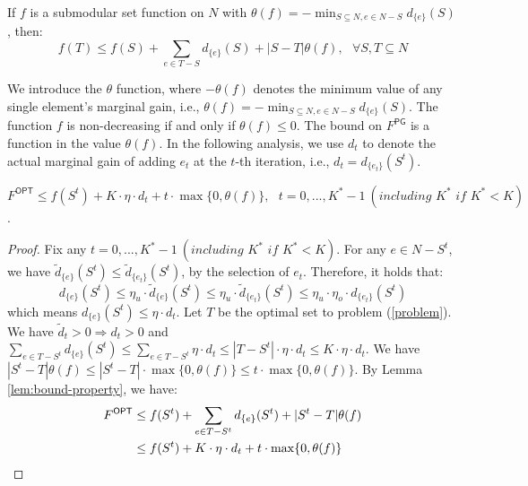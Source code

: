 \begin{lemma}  \label{lem:bound-property}
If $f$ is a submodular set function on $N$ with $\theta(f) = - \min_{S \subseteq N, e \in N - S}{d_{\{e\}}{(S)}}$, then:
\[ f(T) \leq f(S) + \sum_{e \in T - S}{d_{\{e\}}(S)} + |S-T| \theta(f), ~~~ \forall S, T \subseteq N \]
\end{lemma}

We introduce the $\theta$ function, where $-\theta(f)$ denotes the minimum value of any single element's marginal gain, i.e.,  
$\theta(f) = - \min_{S \subseteq N, e \in N - S}{d_{\{e\}}{(S)}}$.
The function $f$ is non-decreasing if and only if $\theta(f) \leq 0$. The bound on $F^{\textsf{PG}}$ is a function in the value $\theta(f)$. In the following analysis, we use $d_t$ to denote the actual marginal gain of adding $e_t$ at the $t$-th iteration, i.e., $d_t = {d}_{\{e_t\}}(S^{t})$. 


\begin{lemma} \label{lem:bounds on f(S^t)}
$F^{\textsf{OPT}} \leq f(S^t) + K \cdot \eta \cdot d_{t} + t \cdot \max \{ 0, \theta(f) \}, ~~~ t = 0, ..., K^*-1 ~(\textit{including } K^* \textit{ if } K^* < K)$.
\end{lemma}
\begin{proof}
Fix any $t = 0, ..., K^* - 1 ~(\textit{including } K^* \textit{ if } K^* < K)$. 
For any $e \in N - S^t$, we have $\tilde{d}_{\{e\}}(S^{t}) \leq \tilde{d}_{\{e_t\}}(S^{t})$, by the selection of $e_t$. Therefore, it holds that:
\[ d_{\{e\}}(S^t) \leq \eta_u \cdot \tilde{d}_{\{e\}}(S^{t}) \leq \eta_u \cdot \tilde{d}_{\{e_t\}}(S^{t}) \leq \eta_u \cdot \eta_o \cdot {d}_{\{e_t\}}(S^{t}) \]
which means $d_{\{e\}}(S^t) \leq \eta \cdot d_t$. 
Let $T$ be the optimal set to problem (\ref{problem}). We have $\tilde{d}_t > 0 \Rightarrow d_t > 0$ and $\sum_{e \in T - S^t}{d_{\{e\}}(S^t)} \leq \sum_{e \in T - S^t}{\eta \cdot d_t} \leq |T - S^t| \cdot \eta \cdot d_t \leq K \cdot \eta \cdot d_t$.
We have $|S^t-T| \theta(f) \leq |S^t-T| \cdot \max \{ 0, \theta(f) \} \leq t \cdot \max \{ 0, \theta(f) \}$. 
By Lemma \ref{lem:bound-property}, we have:
\begin{align*}
    F^{\textsf{OPT}} &\leq f(S^t) + \sum_{e \in T - S^t}{d_{\{e\}}(S^t)} + |S^t-T| \theta(f) \\
    &\leq f(S^t) + K \cdot \eta \cdot d_{t} + t \cdot \max \{ 0, \theta(f) \} \qedhere
\end{align*}
\end{proof}

